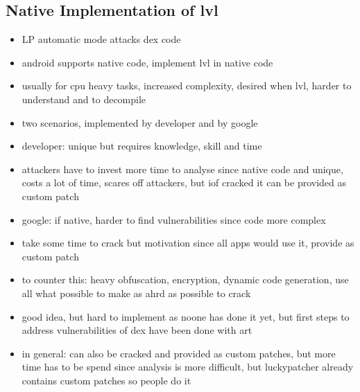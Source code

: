 \subsection{Native Implementation of \gls{lvl}} \label{subsection:counter-modifications-dynamic}
\begin{itemize}
  \item LP automatic mode attacks dex code
  \item android supports native code, implement lvl in native code
  \item usually for cpu heavy tasks, increased complexity, desired when lvl, harder to understand and to decompile
  \item two scenarios, implemented by developer and by google
  \item developer: unique but requires knowledge, skill and time
  \item attackers have to invest more time to analyse since native code and unique, costs a lot of time, scares off attackers, but iof cracked it can be provided as custom patch
  \item google: if native, harder to find vulnerabilities since code more complex
  \item take some time to crack but motivation since all apps would use it, provide as custom patch
  \item to counter this: heavy obfuscation, encryption, dynamic code generation, use all what possible to make as ahrd as possible to crack
  \item good idea, but hard to implement as noone has done it yet, but first steps to address vulnerabilities of dex have been done with art

\item in general: can also be cracked and provided as custom patches, but more time has to be spend since analysis is more difficult, but luckypatcher already contains custom patches so people do it
\end{itemize}
